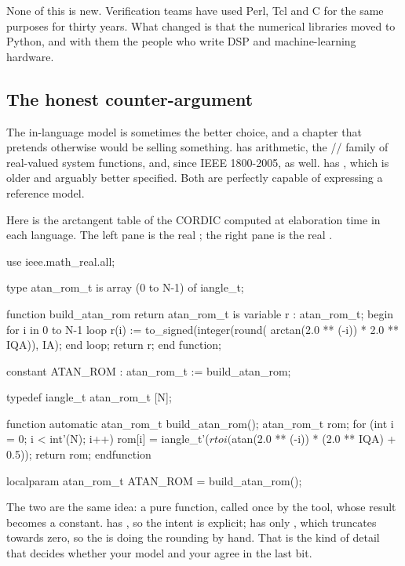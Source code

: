 None of this is new. Verification teams have used Perl, Tcl and C for the same
purposes for thirty years. What changed is that the numerical libraries moved
to Python, and with them the people who write DSP and machine-learning
hardware.

\subsection{The honest counter-argument}

The in-language model is sometimes the better choice, and a chapter that
pretends otherwise would be selling something. \SV{} has 
arithmetic, the // family of real-valued
system functions, and, since IEEE 1800-2005,  as well.
\VHDL{} has , which is older and arguably better
specified. Both are perfectly capable of expressing a reference model.

Here is the arctangent table of the CORDIC computed at elaboration time in
each language. The left pane is the real ; the right
pane is the real .

\begin{rosetta}
\begin{rleft}
use ieee.math_real.all;

type atan_rom_t is
  array (0 to N-1) of iangle_t;

function build_atan_rom
  return atan_rom_t is
  variable r : atan_rom_t;
begin
  for i in 0 to N-1 loop
    r(i) := to_signed(integer(round(
      arctan(2.0 ** (-i))
        * 2.0 ** IQA)), IA);
  end loop;
  return r;
end function;

constant ATAN_ROM : atan_rom_t
  := build_atan_rom;
\end{rleft}
\begin{rright}
typedef iangle_t atan_rom_t [N];

function automatic atan_rom_t
    build_atan_rom();
  atan_rom_t rom;
  for (int i = 0; i < int'(N); i++)
    rom[i] = iangle_t'($rtoi(
      $atan(2.0 ** (-i))
        * (2.0 ** IQA) + 0.5));
  return rom;
endfunction

localparam atan_rom_t ATAN_ROM =
  build_atan_rom();
\end{rright}
\end{rosetta}

The two are the same idea: a pure function, called once by the tool, whose
result becomes a constant. \VHDL{} has , so the intent is
explicit; \SV{} has only , which truncates towards zero, so the
 is doing the rounding by hand. That is the kind of detail that
decides whether your model and your \RTL{} agree in the last bit.

